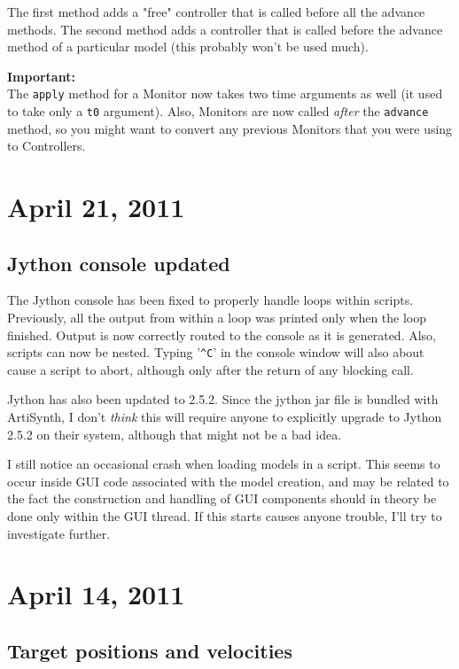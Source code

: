 \documentclass{article}
\begin{document}
The first method adds a "free" controller that is called before all
the advance methods.  The second method adds a controller that is
called before the advance method of a particular model (this
probably won't be used much). 

\begin{sideblock}
{\bf Important:}\\
The {\tt apply} method for a Monitor now takes two time arguments as well
(it used to take only a {\tt t0} argument). Also, Monitors are now called
{\it after} the {\tt advance} method, so you might want to convert any
previous Monitors that you were using to Controllers.
\end{sideblock}

\section*{April 21, 2011}

\subsection*{Jython console updated}

The Jython console has been fixed to properly handle loops within
scripts. Previously, all the output from within a loop was printed
only when the loop finished. Output is now correctly routed to the
console as it is generated. Also, scripts can now be nested.  Typing
'{\tt \verb|^|C}' in the console window will also about cause a script to abort,
although only after the return of any blocking call.

Jython has also been updated to 2.5.2. Since the jython jar file is
bundled with ArtiSynth, I don't {\it think} this will require anyone to
explicitly upgrade to Jython 2.5.2 on their system, although that
might not be a bad idea.

I still notice an occasional crash when loading models in a
script. This seems to occur inside GUI code associated with the model
creation, and may be related to the fact the construction and handling
of GUI components should in theory be done only within the GUI thread.
If this starts causes anyone trouble, I'll try to investigate further.

\section*{April 14, 2011}

\subsection*{Target positions and velocities}
\end{document}
